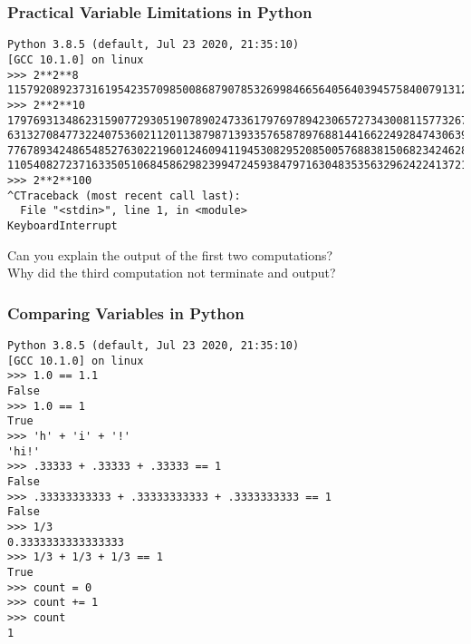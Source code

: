 \documentclass[14pt,aspectratio=169]{beamer}
\begin{document}
%
\begin{frame}[fragile]
  \frametitle{Practical Variable Limitations in Python}
  \normalsize
  \hspace*{.05in}
  \begin{minipage}{6in}
    \begin{verbatim}
Python 3.8.5 (default, Jul 23 2020, 21:35:10)
[GCC 10.1.0] on linux
>>> 2**2**8
115792089237316195423570985008687907853269984665640564039457584007913129639936
>>> 2**2**10
1797693134862315907729305190789024733617976978942306572734300811577326758055009
6313270847732240753602112011387987139335765878976881441662249284743063947412437
7767893424865485276302219601246094119453082952085005768838150682342462881473913
110540827237163350510684586298239947245938479716304835356329624224137216
>>> 2**2**100
^CTraceback (most recent call last):
  File "<stdin>", line 1, in <module>
KeyboardInterrupt
    \end{verbatim}
  \end{minipage}
  \begin{center}
    \normalsize \noindent Can you explain the output of the first two computations? \\
    Why did the third computation not terminate and output?
  \end{center}
\end{frame}

%
\begin{frame}[fragile]
  \frametitle{Comparing Variables in Python}
  \normalsize
  \hspace*{.05in}
  \begin{minipage}{6in}
    \vspace*{-.10in}
    \begin{verbatim}
Python 3.8.5 (default, Jul 23 2020, 21:35:10)
[GCC 10.1.0] on linux
>>> 1.0 == 1.1
False
>>> 1.0 == 1
True
>>> 'h' + 'i' + '!'
'hi!'
>>> .33333 + .33333 + .33333 == 1
False
>>> .33333333333 + .33333333333 + .3333333333 == 1
False
>>> 1/3
0.3333333333333333
>>> 1/3 + 1/3 + 1/3 == 1
True
>>> count = 0
>>> count += 1
>>> count
1
    \end{verbatim}
  \end{minipage}
\end{frame}
\end{document}
